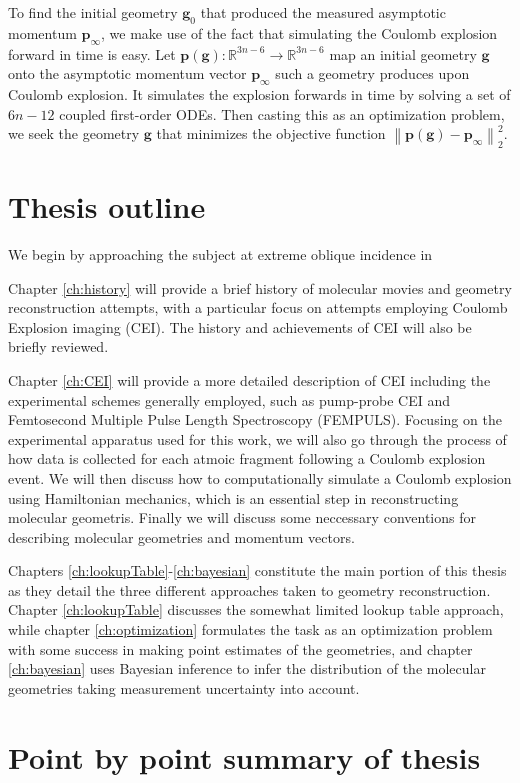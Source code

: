 To find the initial geometry $\mathbf{g}_0$ that produced the measured asymptotic momentum $\mathbf{p}_\infty$, we make use of the fact that simulating the Coulomb explosion forward in time is easy. Let $\mathbf{p}(\mathbf{g}) : \mathbb{R}^{3n-6} \rightarrow \mathbb{R}^{3n-6}$ map an initial geometry $\mathbf{g}$ onto the asymptotic momentum vector $\mathbf{p}_\infty$ such a geometry produces upon Coulomb explosion. It simulates the explosion forwards in time by solving a set of $6n-12$ coupled first-order ODEs. Then casting this as an optimization problem, we seek the geometry $\mathbf{g}$ that minimizes the objective function $\left\| \mathbf{p}(\mathbf{g}) - \mathbf{p}_\infty \right\|_2^2$.

\section{Thesis outline}

We begin by approaching the subject at extreme oblique incidence in

Chapter \ref{ch:history} will provide a brief history of molecular movies and geometry reconstruction attempts, with a particular focus on attempts employing Coulomb Explosion imaging (CEI). The history and achievements of CEI will also be briefly reviewed.

Chapter \ref{ch:CEI} will provide a more detailed description of CEI including the experimental schemes generally employed, such as pump-probe CEI and Femtosecond Multiple Pulse Length Spectroscopy (FEMPULS). Focusing on the experimental apparatus used for this work, we will also go through the process of how data is collected for each atmoic fragment following a Coulomb explosion event. We will then discuss how to computationally simulate a Coulomb explosion using Hamiltonian mechanics, which is an essential step in reconstructing molecular geometris. Finally we will discuss some neccessary conventions for describing molecular geometries and momentum vectors.

Chapters \ref{ch:lookupTable}-\ref{ch:bayesian} constitute the main portion of this thesis as they detail the three different approaches taken to geometry reconstruction. Chapter \ref{ch:lookupTable} discusses the somewhat limited lookup table approach, while chapter \ref{ch:optimization} formulates the task as an optimization problem with some success in making point estimates of the geometries, and chapter \ref{ch:bayesian} uses Bayesian inference to infer the distribution of the molecular geometries taking measurement uncertainty into account.

\section{Point by point summary of thesis}